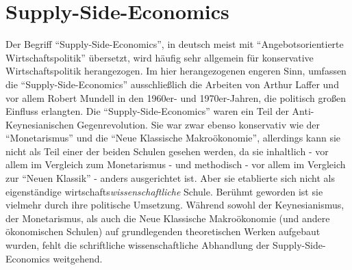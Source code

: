 %
%
%

\chapter{Supply-Side-Economics}
\label{Supply-Side-Economics}

Der Begriff "`Supply-Side-Economics"', in deutsch meist mit "`Angebotsorientierte Wirtschaftspolitik"' übersetzt, wird häufig sehr allgemein für konservative Wirtschaftspolitik herangezogen. Im hier herangezogenen engeren Sinn, umfassen die "`Supply-Side-Economics"' ausschließlich die Arbeiten von Arthur Laffer und vor allem Robert Mundell in den 1960er- und 1970er-Jahren, die politisch großen Einfluss erlangten.
Die "`Supply-Side-Economics"' waren ein Teil der Anti-Keynesianischen Gegenrevolution. Sie war zwar ebenso konservativ wie der "`Monetarismus"' und die "`Neue Klassische Makroökonomie"', allerdings kann sie nicht als Teil einer der beiden Schulen gesehen werden, da sie inhaltlich - vor allem im Vergleich zum Monetarismus - und methodisch - vor allem im Vergleich zur "`Neuen Klassik"' -  anders ausgerichtet ist. Aber sie etablierte sich nicht als eigenständige wirtschafts\textit{wissenschaftliche} Schule. Berühmt geworden ist sie vielmehr durch ihre politische Umsetzung. Während sowohl der Keynesianismus, der Monetarismus, als auch die Neue Klassische Makroökonomie (und andere ökonomischen Schulen) auf grundlegenden theoretischen Werken aufgebaut wurden, fehlt die schriftliche wissenschaftliche Abhandlung der Supply-Side-Economics weitgehend. 

